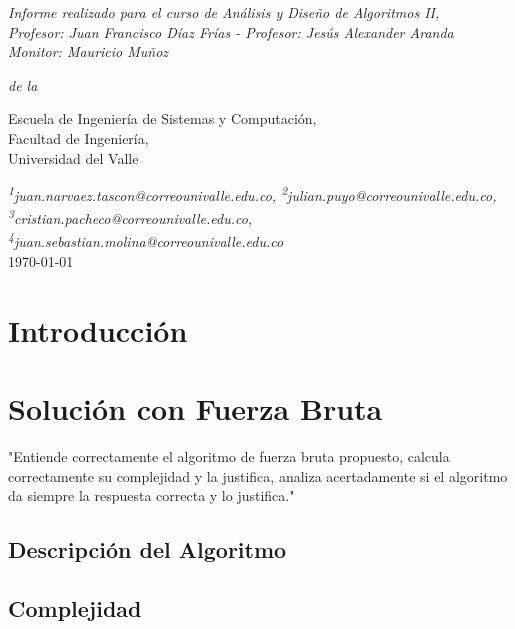 \documentclass[letterpaper,10pt]{article}
\begin{document}
\begin{titlepage}
\begin{center}
    \vspace{2cm}
    
    \large \textit{
    Informe realizado para el curso de Análisis y Diseño de Algoritmos II,\\
    Profesor: Juan Francisco Díaz Frías - Profesor: Jesús Alexander Aranda\\
    Monitor: Mauricio Muñoz} 
    
    \vspace{0.3cm} %
    
    \textit{de la}
    
    \vspace{0.4cm}
    
    Escuela de Ingeniería de Sistemas y Computación,\\ 
    Facultad de Ingeniería,\\ 
    Universidad del Valle
    
    \vspace{1.0cm} 
    {\color{crtitle} \small \textit{  
        \textsuperscript{1}juan.narvaez.tascon@correounivalle.edu.co, 
        \textsuperscript{2}julian.puyo@correounivalle.edu.co, 
        \textsuperscript{3}cristian.pacheco@correounivalle.edu.co,
        \textsuperscript{4}juan.sebastian.molina@correounivalle.edu.co
    }}\\
    \today
     
    
    \end{center}
    \end{titlepage}
\newpage

\tableofcontents
\newpage
\section{Introducción}
\label{sec:introduccion}

\section{Solución con Fuerza Bruta}
\label{sec:fuerza_bruta}
"Entiende correctamente el algoritmo de fuerza bruta propuesto, calcula correctamente su complejidad y la justifica, analiza acertadamente si el algoritmo da siempre la respuesta correcta y lo justifica."
\subsection{Descripción del Algoritmo}
\label{subsec:descripcion_fuerza_bruta}
\subsection{Complejidad}
\label{subsec:complejidad_fuerza_bruta}
\end{document}
